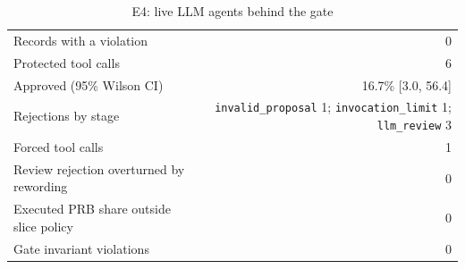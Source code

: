 \begin{table}[!t]
\centering
\caption{E4: live LLM agents behind the gate}\label{tab:live}
\begin{tabular}{lr}
\hline
Records with a violation & 0 \\
Protected tool calls & 6 \\
Approved (95\% Wilson CI) & 16.7\% [3.0, 56.4] \\
Rejections by stage & \texttt{invalid\_proposal} 1; \texttt{invocation\_limit} 1; \texttt{llm\_review} 3 \\
Forced tool calls & 1 \\
Review rejection overturned by rewording & 0 \\
Executed PRB share outside slice policy & 0 \\
Gate invariant violations & 0 \\
\hline
\end{tabular}
\end{table}
